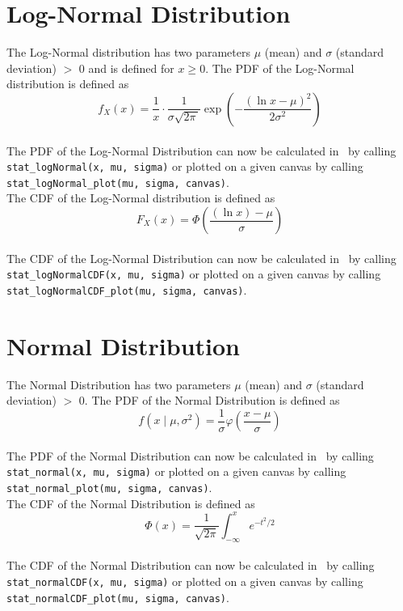 	\section{Log-Normal Distribution}
	
		The Log-Normal distribution has two parameters $\mu$ (mean) and $\sigma$ (standard deviation) $>$ 0 and is defined for $x \geq 0$. The \ac{PDF} of the Log-Normal distribution is defined as
		\\[0.3cm]
		$$f_X(x) = \frac 1 x \cdot \frac 1 {\sigma\sqrt{2\pi\,}} \exp\left( -\frac{(\ln x-\mu)^2}{2\sigma^2} \right)$$
		\\[0.3cm]
		The \ac{PDF} of the Log-Normal Distribution can now be calculated in \setlx\ by calling \lstinline{stat_logNormal(x, mu, sigma)} or plotted on a given canvas by calling \lstinline{stat_logNormal_plot(mu, sigma, canvas)}.
		\\[0.3cm]
		The \ac{CDF} of the Log-Normal distribution is defined as
		\\[0.3cm]
		$$F_X(x) = \Phi\left( \frac{(\ln x) - \mu} \sigma \right)$$
		\\[0.3cm]
		The \ac{CDF} of the Log-Normal Distribution can now be calculated in \setlx\ by calling \lstinline{stat_logNormalCDF(x, mu, sigma)} or plotted on a given canvas by calling \lstinline{stat_logNormalCDF_plot(mu, sigma, canvas)}.

	\section{Normal Distribution}
	
		The Normal Distribution has two parameters $\mu$ (mean) and $\sigma$ (standard deviation) $>$ 0. The \ac{PDF} of the Normal Distribution is defined as
		\\[0.3cm]
		$$f(x \mid \mu, \sigma^2) =\frac 1 \sigma \varphi\left(\frac{x-\mu} \sigma \right)$$
		\\[0.3cm]
		The \ac{PDF} of the Normal Distribution can now be calculated in \setlx\ by calling \lstinline{stat_normal(x, mu, sigma)} or plotted on a given canvas by calling \lstinline{stat_normal_plot(mu, sigma, canvas)}.
		\\[0.3cm]
		The \ac{CDF} of the Normal Distribution is defined as
		\\[0.3cm]
		$$\Phi(x) = \frac 1 {\sqrt{2\pi}} \int_{-\infty}^x e^{-t^2/2}$$
		\\[0.3cm]
		The \ac{CDF} of the Normal Distribution can now be calculated in \setlx\ by calling \lstinline{stat_normalCDF(x, mu, sigma)} or plotted on a given canvas by calling \lstinline{stat_normalCDF_plot(mu, sigma, canvas)}.
		
